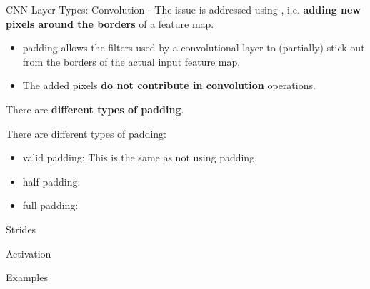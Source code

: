 \begin{frame}[t,allowframebreaks]{CNN Layer Types: Convolution -}
    The issue is addressed using , 
    i.e. {\bf adding new pixels around the borders} of a \gls{feature map}.\\
    \begin{itemize}
        \item
        \Gls{padding} allows the \glspl{filter} used by a convolutional layer
        to (partially) stick out from the borders of the actual input \gls{feature map}.\\
        \item
        The added pixels {\bf do not contribute in convolution} operations.\\
    \end{itemize}
    \vspace{0.2cm}

    There are {\bf different types of padding}.\\

    \framebreak

    There are different types of \gls{padding}:
    \begin{itemize}
        \item 
        \Gls{valid padding}: This is the same as not using padding.
        \item 
        \Gls{half padding}:
        \item 
        \Gls{full padding}:
    \end{itemize}


    \framebreak

    Strides

    \framebreak

    Activation

    \framebreak

    Examples
    
\end{frame}